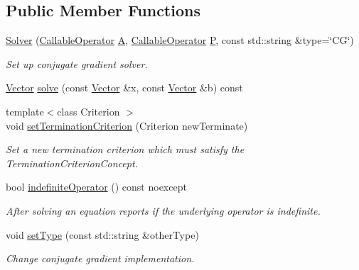 \subsection*{Public Member Functions}
\begin{DoxyCompactItemize}
\item 
\hyperlink{classSpacy_1_1CG_1_1Solver_a4b6e80b42da6ee9a64cbd07f85964cd5}{Solver} (\hyperlink{namespaceSpacy_a022a87afa759e18781dd2aea9a80cd73}{Callable\+Operator} \hyperlink{classSpacy_1_1CG_1_1Solver_a9b0fa76350c42fb60b2fbeb40b343fa2}{A}, \hyperlink{namespaceSpacy_a022a87afa759e18781dd2aea9a80cd73}{Callable\+Operator} \hyperlink{classSpacy_1_1CG_1_1Solver_a929d2b9deecfd96ef7efb8097e567f37}{P}, const std\+::string \&type=\char`\"{}CG\char`\"{})
\begin{DoxyCompactList}\small\item\em Set up conjugate gradient solver. \end{DoxyCompactList}\item 
\hyperlink{classSpacy_1_1Vector}{Vector} \hyperlink{classSpacy_1_1CG_1_1Solver_a23770606bb41f2d8f5a6ae71d07934ab}{solve} (const \hyperlink{classSpacy_1_1Vector}{Vector} \&x, const \hyperlink{classSpacy_1_1Vector}{Vector} \&b) const 
\item 
{\footnotesize template$<$class Criterion $>$ }\\void \hyperlink{classSpacy_1_1CG_1_1Solver_a7fe2345e859b267c86acff9f3920db3b}{set\+Termination\+Criterion} (Criterion new\+Terminate)
\begin{DoxyCompactList}\small\item\em Set a new termination criterion which must satisfy the Termination\+Criterion\+Concept. \end{DoxyCompactList}\item 
bool \hyperlink{classSpacy_1_1CG_1_1Solver_ae0b6c7b754e093610df6d67bf3067acf}{indefinite\+Operator} () const noexcept
\begin{DoxyCompactList}\small\item\em After solving an equation reports if the underlying operator is indefinite. \end{DoxyCompactList}\item 
void \hyperlink{classSpacy_1_1CG_1_1Solver_a4009b5e2062e4930f0cfdc9d979c7b80}{set\+Type} (const std\+::string \&other\+Type)
\begin{DoxyCompactList}\small\item\em Change conjugate gradient implementation. \end{DoxyCompactList}\item 

\end{DoxyCompactItemize}
